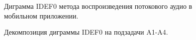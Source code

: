            \newpage
            \begin{figure}[!h]
                \caption{Диграмма IDEF0 метода воспроизведения потокового аудио в мобильном приложении.}
                \label{fig:idef0}
            \end{figure}

            \begin{figure}[!h]
                \caption{Декомпозиция диграммы IDEF0 на подзадачи A1-A4.}
                \label{fig:idef0-det}
            \end{figure}
    
